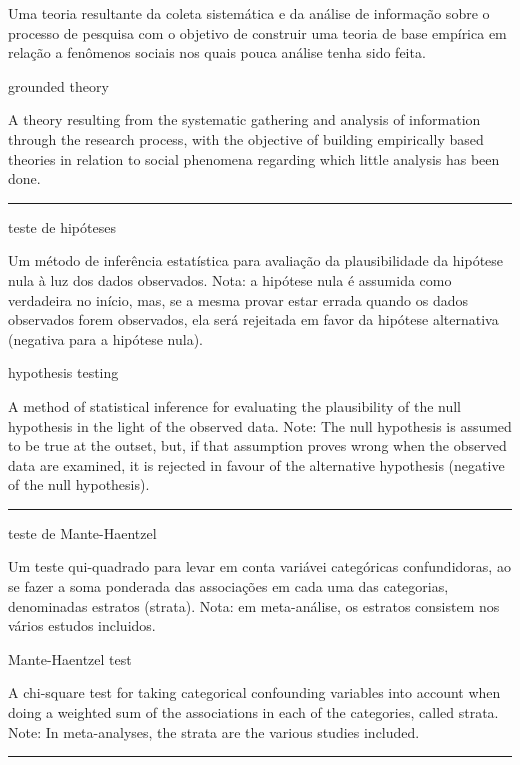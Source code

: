 \documentclass[
]{book}
\begin{document}
Uma teoria resultante da coleta sistemática e da análise de informação sobre o processo de pesquisa com o objetivo de construir uma teoria de base empírica em relação a fenômenos sociais nos quais pouca análise tenha sido feita.

grounded theory

A theory resulting from the systematic gathering and analysis of information through the research process, with the objective of building empirically based theories in relation to social phenomena regarding which little analysis has been done.

\begin{center}\rule{0.5\linewidth}{0.5pt}\end{center}

teste de hipóteses

Um método de inferência estatística para avaliação da plausibilidade da hipótese nula à luz dos dados observados. Nota: a hipótese nula é assumida como verdadeira no início, mas, se a mesma provar estar errada quando os dados observados forem observados, ela será rejeitada em favor da hipótese alternativa (negativa para a hipótese nula).

hypothesis testing

A method of statistical inference for evaluating the plausibility of the null hypothesis in the light of the observed data. Note: The null hypothesis is assumed to be true at the outset, but, if that assumption proves wrong when the observed data are examined, it is rejected in favour of the alternative hypothesis (negative of the null hypothesis).

\begin{center}\rule{0.5\linewidth}{0.5pt}\end{center}

teste de Mante-Haentzel

Um teste qui-quadrado para levar em conta variávei categóricas confundidoras, ao se fazer a soma ponderada das associações em cada uma das categorias, denominadas estratos (strata). Nota: em meta-análise, os estratos consistem nos vários estudos incluidos.

Mante-Haentzel test

A chi-square test for taking categorical confounding variables into account when doing a weighted sum of the associations in each of the categories, called strata. Note: In meta-analyses, the strata are the various studies included.

\begin{center}\rule{0.5\linewidth}{0.5pt}\end{center}
\end{document}
